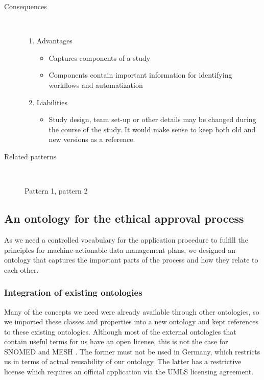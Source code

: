 \documentclass[10pt]{article}
\begin{document}
\begin{description}
\begin{enumerate}
	\end{enumerate}
	
	

	\item[Consequences]~\par
		\begin{enumerate}
			\item Advantages
			\begin{itemize}
				\item Captures components of a study
				\item Components contain important information for identifying workflows and automatization
			\end{itemize}
			\item Liabilities
			\begin{itemize}
				\item Study design, team set-up or other details may be changed during the course of the study. It would make sense to keep both old and new versions as a reference.

			\end{itemize}
		\end{enumerate}

		
	\item[Related patterns]~\par
		Pattern 1, pattern 2
\end{description}
\subsection{An ontology for the ethical approval process}
As we need a controlled vocabulary for the application procedure to fulfill the principles for machine-actionable data management plans, we designed an ontology that captures the important parts of the process and how they relate to each other. 

\subsubsection{Integration of existing ontologies}
Many of the concepts we need were already available through other ontologies, so we imported these classes and properties into a new ontology and kept references to these existing ontologies. Although most of the external ontologies that contain useful terms for us have an open license, this is not the case for SNOMED \cite{snomed} and MESH \cite{mesh}. The former must not be used in Germany, which restricts us in terms of actual reusability of our ontology. The latter has a restrictive license which requires an official application via the UMLS licensing agreement.
\end{document}
